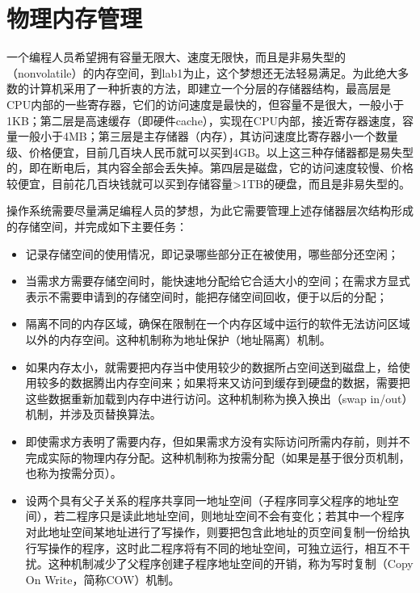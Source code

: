 \section{物理内存管理}\label{ux7269ux7406ux5185ux5b58ux7ba1ux7406}

一个编程人员希望拥有容量无限大、速度无限快，而且是非易失型的（nonvolatile）的内存空间，到lab1为止，这个梦想还无法轻易满足。为此绝大多数的计算机采用了一种折衷的方法，即建立一个分层的存储器结构，最高层是CPU内部的一些寄存器，它们的访问速度是最快的，但容量不是很大，一般小于1KB；第二层是高速缓存（即硬件cache），实现在CPU内部，接近寄存器速度，容量一般小于4MB；第三层是主存储器（内存），其访问速度比寄存器小一个数量级、价格便宜，目前几百块人民币就可以买到4GB。以上这三种存储器都是易失型的，即在断电后，其内容全部会丢失掉。第四层是磁盘，它的访问速度较慢、价格较便宜，目前花几百块钱就可以买到存储容量\textgreater{}1TB的硬盘，而且是非易失型的。

操作系统需要尽量满足编程人员的梦想，为此它需要管理上述存储器层次结构形成的存储空间，并完成如下主要任务：

\begin{itemize}
\tightlist
\item
  记录存储空间的使用情况，即记录哪些部分正在被使用，哪些部分还空闲；
\item
  当需求方需要存储空间时，能快速地分配给它合适大小的空间；在需求方显式表示不需要申请到的存储空间时，能把存储空间回收，便于以后的分配；
\item
  隔离不同的内存区域，确保在限制在一个内存区域中运行的软件无法访问区域以外的内存空间。这种机制称为地址保护（地址隔离）机制。
\item
  如果内存太小，就需要把内存当中使用较少的数据所占空间送到磁盘上，给使用较多的数据腾出内存空间来；如果将来又访问到缓存到硬盘的数据，需要把这些数据重新加载到内存中进行访问。这种机制称为换入换出（swap
  in/out）机制，并涉及页替换算法。
\item
  即使需求方表明了需要内存，但如果需求方没有实际访问所需内存前，则并不完成实际的物理内存分配。这种机制称为按需分配（如果是基于很分页机制，也称为按需分页）。
\item
  设两个具有父子关系的程序共享同一地址空间（子程序同享父程序的地址空间），若二程序只是读此地址空间，则地址空间不会有变化；若其中一个程序对此地址空间某地址进行了写操作，则要把包含此地址的页空间复制一份给执行写操作的程序，这时此二程序将有不同的地址空间，可独立运行，相互不干扰。这种机制减少了父程序创建子程序地址空间的开销，称为写时复制（Copy
  On Write，简称COW）机制。
\end{itemize}

